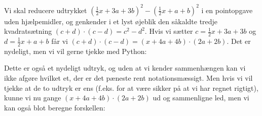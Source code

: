 \documentclass[letterpaper,10pt,english]{jupyterBook}
\begin{document}
Vi skal reducere udtrykket \((\frac{1}{2}x+3a+3b)^2 - (\frac{1}{2}x+a+b)^2\) i en pointopgave uden hjælpemidler, og genkender i et lyst øjeblik den såkaldte tredje kvadratsætning \((c+d)\cdot(c-d) = c^2-d^2\). Hvis vi sætter \(c=\frac{1}{2}x+3a+3b\) og \(d=\frac{1}{2}x+a+b\) får vi \((c+d)\cdot(c-d) = (x+4a+4b)\cdot(2a+2b)\). Det er nydeligt, men vi vil gerne tjekke med Python:

\begin{sphinxVerbatim}[commandchars=\\\{\}]
    
\end{sphinxVerbatim}

\noindent{}

\noindent{}

Dette er også et nydeligt udtryk, og uden at vi kender sammenhængen kan vi ikke afgøre hvilket et, der er det pæneste rent notationsmæssigt. Men hvis vi vil tjekke at de to udtryk er ens (f.eks. for at være sikker på at vi har regnet rigtigt), kunne vi nu gange \((x+4a+4b)\cdot(2a+2b)\) ud og sammenligne led, men vi kan også blot beregne forskellen:

\begin{sphinxVerbatim}[commandchars=\\\{\}]
      
\end{sphinxVerbatim}
\end{document}
